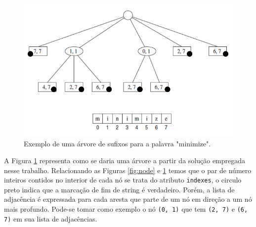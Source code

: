 \begin{figure}[h]
	\begin{center}
		\includegraphics[scale=0.5]{Figuras/compact-trie.png}
	\end{center}
    \caption{\label{fig:compact-trie} Exemplo de uma árvore de sufixos para a palavra "minimize".}
\end{figure}


A Figura \ref{fig:compact-trie} representa como se daria uma árvore a partir da
solução empregada nesse trabalho.
Relacionando as Figuras \ref{fig:node} e \ref{fig:compact-trie} temos que o par
de número inteiros contidos no interior de cada nó se trata do atributo
\texttt{indexes}, o circulo preto indica que a marcação de fim de string é
verdadeiro.
Porém, a lista de adjacência é expressada para cada aresta que parte de um nó em
direção a um nó mais profundo.
Pode-se tomar como exemplo o nó \texttt{(0, 1)} que tem \texttt{(2, 7)} e
\texttt{(6, 7)} em sua lista de adjacências.
